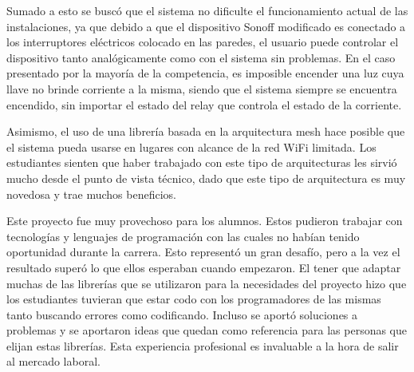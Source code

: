Sumado a esto se buscó que el sistema no dificulte el funcionamiento actual de las instalaciones, ya que debido a que el dispositivo Sonoff modificado es conectado a los interruptores eléctricos colocado en las paredes, el usuario puede controlar el dispositivo tanto analógicamente como con el sistema sin problemas. En el caso presentado por la mayoría de la competencia, es imposible encender una luz cuya llave no brinde corriente a la misma, siendo que el sistema siempre se encuentra encendido, sin importar el estado del relay que controla el estado de la corriente.

Asimismo, el uso de una librería basada en la arquitectura mesh hace posible que el sistema pueda usarse en lugares con alcance de la red WiFi limitada. Los estudiantes sienten que haber trabajado con este tipo de arquitecturas les sirvió mucho desde el punto de vista técnico, dado que este tipo de arquitectura es muy novedosa y trae muchos beneficios.

Este proyecto fue muy provechoso para los alumnos. Estos pudieron trabajar con tecnologías y lenguajes de programación con las cuales no habían tenido oportunidad durante la carrera. Esto representó un gran desafío, pero a la vez el resultado superó lo que ellos esperaban cuando empezaron. El tener que adaptar muchas de las librerías que se utilizaron para la necesidades del proyecto hizo que los estudiantes tuvieran que estar codo con los programadores de las mismas tanto buscando errores como codificando. Incluso se aportó soluciones a problemas y se aportaron ideas que quedan como referencia para las personas que elijan estas librerías. Esta experiencia profesional es invaluable a la hora de salir al mercado laboral.

